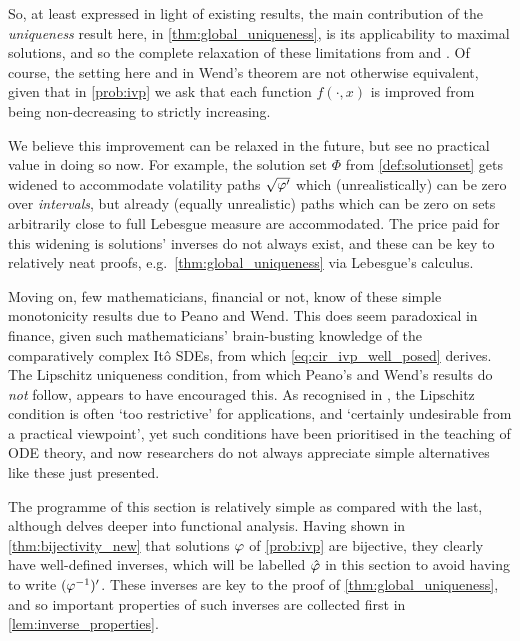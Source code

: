 So, at least expressed in light of existing results, the main contribution of the \emph{uniqueness} result here, in \autoref{thm:global_uniqueness}, is its applicability to maximal solutions, and so the complete relaxation of these limitations from \cite{wend_1969} and \cite{cid_2009}. Of course, the setting here and in Wend's theorem are not otherwise equivalent, given that in \autoref{prob:ivp} we ask that each function $f(\cdot,x)$ is improved from being non-decreasing to strictly increasing.

We believe this improvement can be relaxed in the future, but see no practical value in doing so now. For example, the solution set $\Phi$ from \autoref{def:solutionset} gets widened to accommodate volatility paths $\sqrt{\varphi'}$ which (unrealistically) can be zero over \emph{intervals}, but already (equally unrealistic) paths which can be zero on sets arbitrarily close to full Lebesgue measure are accommodated. The price paid for this widening is solutions' inverses do not always exist, and these can be key to relatively neat proofs, e.g.~\autoref{thm:global_uniqueness} via Lebesgue's calculus.

\vspace{2mm} Moving on, few mathematicians, financial or not, know of these simple monotonicity results due to Peano and Wend. This does seem paradoxical in finance, given such mathematicians' brain-busting knowledge of the comparatively complex It\^o SDEs, from which \autoref{eq:cir_ivp_well_posed} derives. The Lipschitz uniqueness condition, from which Peano's and Wend's results do \emph{not} follow, appears to have encouraged this. As recognised in \cite{soong_1973}, the Lipschitz condition is often `too restrictive' for applications, and `certainly undesirable from a practical viewpoint', yet such conditions have been prioritised in the teaching of ODE theory, and now researchers do not always appreciate simple alternatives like these just presented.

The programme of this section is relatively simple as compared with the last, although delves deeper into functional analysis. Having shown in \autoref{thm:bijectivity_new} that solutions $\varphi$ of \autoref{prob:ivp} are bijective, they clearly have well-defined inverses, which will be labelled $\hat{\varphi}$ in this section to avoid having to write $(\varphi^{-1})'$. These inverses are key to the proof of \autoref{thm:global_uniqueness}, and so important properties of such inverses are collected first in \autoref{lem:inverse_properties}.

